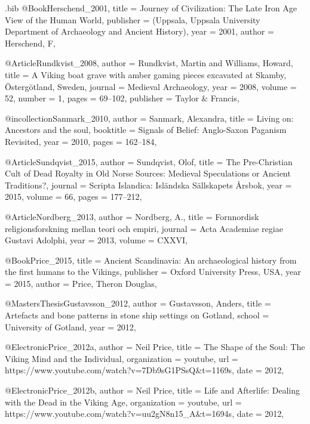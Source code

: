 \begin{filecontents}{\IJSRAidentifier.bib}
@Book{Herschend_2001,
	title     = {Journey of Civilization: The Late Iron Age View of the Human World},
	publisher = {(Uppsala, Uppsala University Department of Archaeology and Ancient History)},
	year      = {2001},
	author    = {Herschend, F},
}

@Article{Rundkvist_2008,
	author    = {Rundkvist, Martin and Williams, Howard},
	title     = {A Viking boat grave with amber gaming pieces excavated at Skamby, {\"O}sterg{\"o}tland, Sweden},
	journal   = {Medieval Archaeology},
	year      = {2008},
	volume    = {52},
	number    = {1},
	pages     = {69--102},
	publisher = {Taylor \& Francis},
}

@incollection{Sanmark_2010,
	author  = {Sanmark, Alexandra},
	title   = {Living on: Ancestors and the soul},
	booktitle = {Signals of Belief: Anglo-Saxon Paganism Revisited},
	year    = {2010},
	pages   = {162--184},
}

@Article{Sundqvist_2015,
	author  = {Sundqvist, Olof},
	title   = {The Pre-Christian Cult of Dead Royalty in Old Norse Sources: Medieval Speculations or Ancient Traditions?},
	journal = {Scripta Islandica: Isl{\"a}ndska S{\"a}llskapets {\AA}rsbok},
	year    = {2015},
	volume  = {66},
	pages   = {177--212},
}

@Article{Nordberg_2013,
	author  = {Nordberg, A.},
	title   = {Fornnordisk religionsforskning mellan teori och empiri},
	journal = {Acta Academiae regiae Gustavi Adolphi},
	year    = {2013},
	volume  = {CXXVI},
}

@Book{Price_2015,
	title     = {Ancient Scandinavia: An archaeological history from the first humans to the Vikings},
	publisher = {Oxford University Press, USA},
	year      = {2015},
	author    = {Price, Theron Douglas},
}

@MastersThesis{Gustavsson_2012,
	author = {Gustavsson, Anders},
	title  = {Artefacts and bone patterns in stone ship settings on Gotland},
	school = {University of Gotland},
	year   = {2012},
}

@Electronic{Price_2012a,
	author       = {Neil Price},
	title        = {The Shape of the Soul: The Viking Mind and the Individual},
	organization = {youtube},
	url          = {https://www.youtube.com/watch?v=7Db9sG1PSsQ&t=1169s},
	date         = {2012},
}

@Electronic{Price_2012b,
	author       = {Neil Price},
	title        = {Life and Afterlife: Dealing with the Dead in the Viking Age},
	organization = {youtube},
	url          = {https://www.youtube.com/watch?v=uu2gN8n15_A&t=1694s},
	date         = {2012},
}


\end{filecontents}
